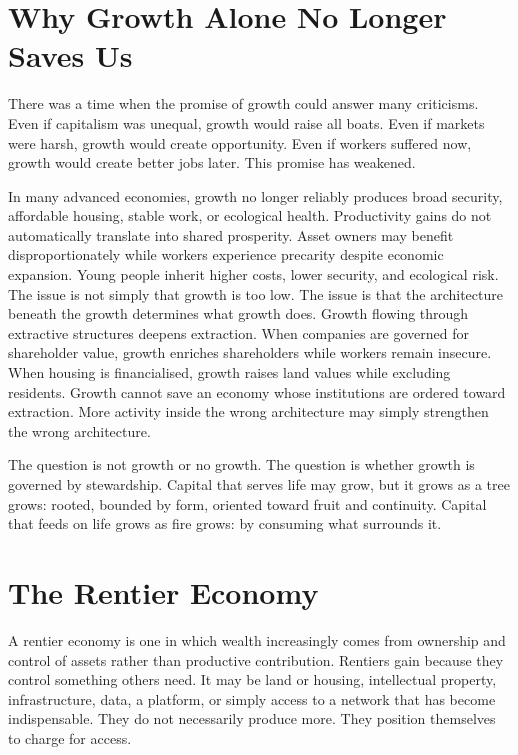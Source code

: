 \documentclass[11pt,a4paper,oneside]{book}
\begin{document}
\section*{Why Growth Alone No Longer Saves Us}

There was a time when the promise of growth could answer many criticisms. Even if capitalism was unequal, growth would raise all boats. Even if markets were harsh, growth would create opportunity. Even if workers suffered now, growth would create better jobs later. This promise has weakened.

In many advanced economies, growth no longer reliably produces broad security, affordable housing, stable work, or ecological health. Productivity gains do not automatically translate into shared prosperity. Asset owners may benefit disproportionately while workers experience precarity despite economic expansion. Young people inherit higher costs, lower security, and ecological risk. The issue is not simply that growth is too low. The issue is that the architecture beneath the growth determines what growth does. Growth flowing through extractive structures deepens extraction. When companies are governed for shareholder value, growth enriches shareholders while workers remain insecure. When housing is financialised, growth raises land values while excluding residents. Growth cannot save an economy whose institutions are ordered toward extraction. More activity inside the wrong architecture may simply strengthen the wrong architecture.

The question is not growth or no growth. The question is whether growth is governed by stewardship. Capital that serves life may grow, but it grows as a tree grows: rooted, bounded by form, oriented toward fruit and continuity. Capital that feeds on life grows as fire grows: by consuming what surrounds it.

\section*{The Rentier Economy}

A rentier economy is one in which wealth increasingly comes from ownership and control of assets rather than productive contribution. Rentiers gain because they control something others need. It may be land or housing, intellectual property, infrastructure, data, a platform, or simply access to a network that has become indispensable. They do not necessarily produce more. They position themselves to charge for access.
\end{document}

